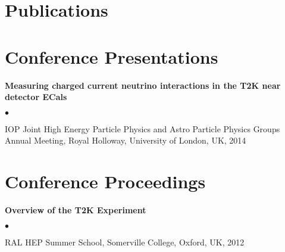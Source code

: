 \documentclass[margin,line]{res}
\newenvironment{list2}{
  \begin{list}{$\bullet$}{%
      \setlength{\itemsep}{0in}
      \setlength{\parsep}{0in} \setlength{\parskip}{0in}
      \setlength{\topsep}{0in} \setlength{\partopsep}{0in} 
      \setlength{\leftmargin}{0.2in}}}{\end{list}}
\begin{document}
\begin{resume}
 

 
\section{\sc Publications}
%
%
%
\begin{refsection}[publications]
\nocite{*}
\printbibliography
\end{refsection}

\section{\sc Conference Presentations}

{\bf Measuring charged current neutrino interactions in the T2K near detector ECals}
\begin{list2}
\item IOP Joint High Energy Particle Physics and Astro Particle Physics Groups Annual Meeting, Royal Holloway, University of London, UK, 2014
\end{list2}

\section{\sc Conference Proceedings}
%
%
%
\begin{refsection}[proceedings]
\nocite{*}
\printbibliography
\end{refsection}


{\bf Overview of the T2K Experiment}
\begin{list2}
\item RAL HEP Summer School, Somerville College, Oxford, UK, 2012
\end{list2}


\end{resume}
\end{document}
